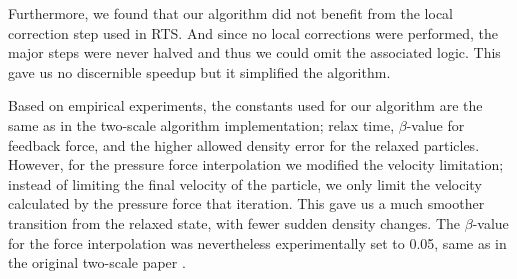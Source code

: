 \documentclass[../../main.tex]{subfiles}
\begin{document}
Furthermore, we found that our algorithm did not benefit from the local correction step used in RTS. And since no local corrections were performed, the major steps were never halved and thus we could omit the associated logic. This gave us no discernible speedup but it simplified the algorithm.

Based on empirical experiments, the constants used for our algorithm are the same as in the two-scale algorithm implementation; relax time, $\beta$-value for feedback force, and the higher allowed density error for the relaxed particles. However, for the pressure force interpolation we modified the velocity limitation; instead of limiting the final velocity of the particle, we only limit the velocity calculated by the pressure force that iteration. This gave us a much smoother transition from the relaxed state, with fewer sudden density changes. The $\beta$-value for the force interpolation was nevertheless experimentally set to 0.05, same as in the original two-scale paper \citep{solenthaler2011two}. 



\end{document}
